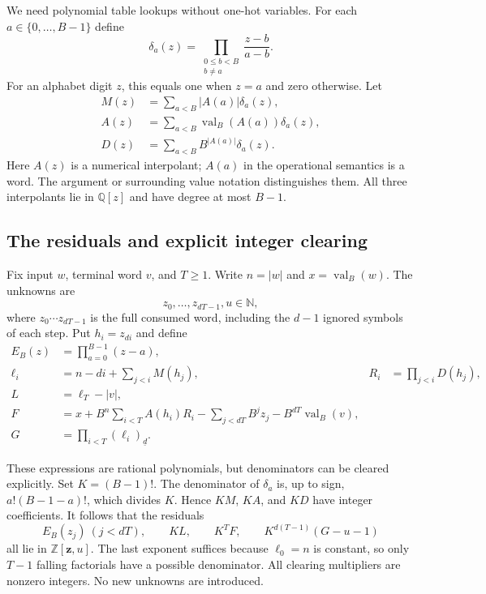 \documentclass[11pt,a4paper]{article}
\theoremstyle{definition}
\theoremstyle{remark}
\newcommand{\N}{\mathbb N}
\newcommand{\Z}{\mathbb Z}
\newcommand{\Q}{\mathbb Q}
\newcommand{\val}{\operatorname{val}}
\newcommand{\ff}[2]{(#1)_{\underline{#2}}}
\begin{document}
We need polynomial table lookups without one-hot variables. For each $a\in\{0,\ldots,B-1\}$ define
\[
 \delta_a(z)=\prod_{\substack{0\leq b<B\\b\ne a}}\frac{z-b}{a-b}.
\]
For an alphabet digit $z$, this equals one when $z=a$ and zero otherwise. Let
\begin{align}
 M(z)&=\sum_{a<B}|A(a)|\delta_a(z),\label{cdc:qc:eq:Mtag}\\
 A(z)&=\sum_{a<B}\val_B(A(a))\delta_a(z),\label{cdc:qc:eq:Atag}\\
 D(z)&=\sum_{a<B}B^{|A(a)|}\delta_a(z).\label{cdc:qc:eq:Dtag}
\end{align}
Here $A(z)$ is a numerical interpolant; $A(a)$ in the operational semantics is a word. The argument or surrounding value notation distinguishes them. All three interpolants lie in $\Q[z]$ and have degree at most $B-1$.

\subsection{The residuals and explicit integer clearing}
Fix input $w$, terminal word $v$, and $T\geq1$. Write $n=|w|$ and $x=\val_B(w)$. The unknowns are
\[
 z_0,\ldots,z_{dT-1},u\in\N,
\]
where $z_0\cdots z_{dT-1}$ is the full consumed word, including the $d-1$ ignored symbols of each step. Put $h_i=z_{di}$ and define
\begin{align}
 E_B(z)&=\prod_{a=0}^{B-1}(z-a),\label{cdc:qc:eq:Etag}\\
 \ell_i&=n-di+\sum_{j<i}M(h_j), & R_i&=\prod_{j<i}D(h_j),\label{cdc:qc:eq:length-tag}\\
 L&=\ell_T-|v|,\label{cdc:qc:eq:Ltag}\\
 F&=x+B^n\sum_{i<T}A(h_i)R_i
       -\sum_{j<dT}B^jz_j-B^{dT}\val_B(v),\label{cdc:qc:eq:Ftag}\\
 G&=\prod_{i<T}\ff{\ell_i}{d}.\label{cdc:qc:eq:Gtag}
\end{align}

These expressions are rational polynomials, but denominators can be cleared explicitly. Set $K=(B-1)!$. The denominator of $\delta_a$ is, up to sign, $a!(B-1-a)!$, which divides $K$. Hence $KM$, $KA$, and $KD$ have integer coefficients. It follows that the residuals
\begin{equation}\label{cdc:qc:eq:integer-tag-residuals}
 E_B(z_j)\ (j<dT),\qquad KL,\qquad K^T F,
 \qquad K^{d(T-1)}(G-u-1)
\end{equation}
all lie in $\Z[\mathbf z,u]$. The last exponent suffices because $\ell_0=n$ is constant, so only $T-1$ falling factorials have a possible denominator. All clearing multipliers are nonzero integers. No new unknowns are introduced.
\end{document}
